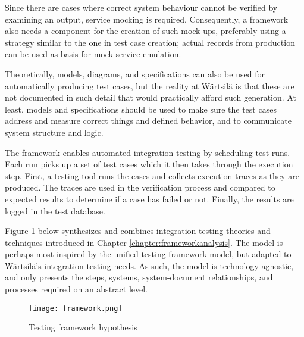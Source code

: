 \documentclass[12pt,a4paper,oneside,pdftex]{report}
\begin{document}
{Since there are cases where correct system behaviour cannot be verified by examining an output, service mocking is required. Consequently, a framework also needs a component for the creation of such mock-ups, preferably using a strategy similar to the one in test case creation; actual records from production can be used as basis for mock service emulation.

Theoretically, models, diagrams, and specifications can also be used for automatically producing test cases, but the reality at Wärtsilä is that these are not documented in such detail that would practically afford such generation. At least, models and specifications should be used to make sure the test cases address and measure correct things and defined behavior, and to communicate system structure and logic. 

The framework enables automated integration testing by scheduling test runs. Each run picks up a set of test cases which it then takes through the execution step. First, a testing tool runs the cases and collects execution traces as they are produced. The traces are used in the verification process and compared to expected results to determine if a case has failed or not. Finally, the results are logged in the test database.

Figure \ref{fig:framework} below synthesizes and combines integration testing theories and techniques introduced in Chapter \ref{chapter:frameworkanalysis}. The model is perhaps most inspired by the \citet{liu2009unified} unified testing framework model, but adapted to Wärtsilä's integration testing needs. As such, the model is technology-agnostic, and only presents the steps, systems, system-document relationships, and processes required on an abstract level.


\begin{figure}[H]
\centering
\texttt{[image: framework.png]}
\caption{Testing framework hypothesis}
\label{fig:framework}
\end{figure}

}
\end{document}

